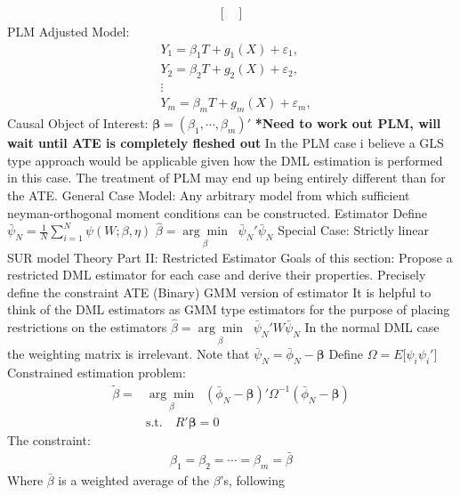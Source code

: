 \documentclass[12pt]{article}
\begin{document}
\begin{outline}[enumerate]
\begin{align*}
\begin{bmatrix}
						\end{bmatrix}
					\end{align*}
		\2 PLM
			\3 Adjusted Model:
				\begin{align*}
				& Y_1 = \beta_1 T + g_1(X) +\varepsilon_1,\\
				& Y_2 =  \beta_2 T + g_2(X) +\varepsilon_2,\\
				&\vdots\\
				&Y_m =  \beta_m T + g_m(X) +\varepsilon_m,
				\end{align*}
			\3 Causal Object of Interest: $\pmb{\beta} = (\beta_1,\cdots,\beta_m)'$
			\3 \textbf{*Need to work out PLM, will wait until ATE is completely fleshed out}
			\3 In the PLM case i believe a GLS type approach would be applicable given how the DML estimation is performed in this case. The treatment of PLM may end up being entirely different than for the ATE.
		\2 General Case
			\3 Model: Any arbitrary model from which sufficient neyman-orthogonal moment conditions can be constructed.
			\3 Estimator
				\4 Define $\bar{\psi}_N = \frac{1}{N} \sum_{i=1}^N \psi(W;\beta,\eta)$
				\4 $\hat{\beta} = \underset{\beta}{\arg\min} \;\;\bar{\psi}_N'\bar{\psi}_N$
		\2 Special Case: Strictly linear SUR model
	\1 Theory Part II: Restricted Estimator
		\2 Goals of this section:
			\3 Propose a restricted DML estimator for each case and derive their properties.
			\3 Precisely define the constraint		
		\2 ATE (Binary)
			\3 GMM version of estimator
				\4 It is helpful to think of the DML estimators as GMM type estimators for the purpose of placing restrictions on the estimators
				\4 $\hat{\beta} = \underset{\beta}{\arg\min} \;\;\bar{\psi}_N'W\bar{\psi}_N$
				\4 In the normal DML case the weighting matrix is irrelevant. 
				\4 Note that $\bar{\psi}_N = \bar{\phi}_N - \pmb{\beta}$
				\4 Define $\Omega = E\big[\psi_i\psi_i'\big]$
				\4 Constrained estimation problem:
				\begin{align*}
				\tilde{\beta} = &\underset{\beta}{\arg\min} \;\;(\bar{\phi}_N - \pmb{\beta})'\Omega^{-1}(\bar{\phi}_N - \pmb{\beta})\\
				& \text{s.t.} \quad  R'\pmb{\beta} = 0
				\end{align*}
			\3 The constraint:
				\4 
					\begin{align*}
						\beta_1 = \beta_2 = \cdots = \beta_m = \bar{\beta}
					\end{align*}
					Where $\bar{\beta}$ is a weighted average of the $\beta$'s, following \cite{mehrabani2020improved}
					\begin{align*}

\end{align*}
\end{outline}
\end{document}
